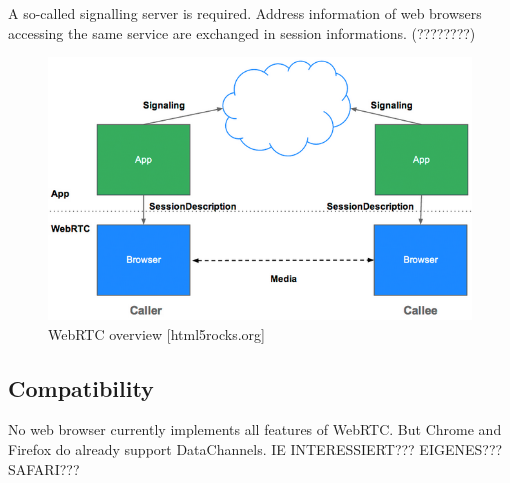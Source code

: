 A so-called signalling server is required. Address information of web browsers accessing the same service are exchanged in session informations. (????????)

\begin{figure}[htp]
  \begin{center}
    \includegraphics[width=0.9\columnwidth]{resources/webrtc.png}
  \end{center}
  \caption{WebRTC overview [html5rocks.org]}
  \label{fig:webrtc}
\end{figure}


\subsection{Compatibility}

No web browser currently implements all features of WebRTC. But Chrome and Firefox do already support DataChannels. IE INTERESSIERT??? EIGENES??? SAFARI??? \cite{webrtc_comp}
